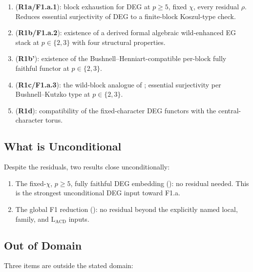 \begin{enumerate}
\item {}
(\textbf{R1a/F1.a.1}): block exhaustion for DEG at \(p\geq 5\),
fixed \(\chi\), every residual \(\rho\). Reduces essential surjectivity
of DEG to a finite-block Koszul-type check.
\item {}
(\textbf{R1b/F1.a.2}): existence of a derived formal algebraic
wild-enhanced EG stack at \(p\in\{2,3\}\) with four structural
properties.
\item {}
(\textbf{R1b'}): existence of the Bushnell--Henniart-compatible
per-block fully faithful functor at \(p\in\{2,3\}\).
\item {}
(\textbf{R1c/F1.a.3}): the wild-block analogue of
; essential
surjectivity per Bushnell--Kutzko type at \(p\in\{2,3\}\).
\item {}
(\textbf{R1d}): compatibility of the fixed-character DEG functors
with the central-character torus.
\end{enumerate}

\subsection{What is Unconditional}

Despite the residuals, two results close unconditionally:

\begin{enumerate}
\item The fixed-\(\chi\), \(p\geq 5\), fully faithful DEG embedding
(): no residual needed.
This is the strongest unconditional DEG input toward F1.a.
\item The global F1 reduction
(): no residual
beyond the explicitly named local, family, and
\(\mathrm{L}_{\mathrm{ACD}}\) inputs.
\end{enumerate}

\subsection{Out of Domain}

Three items are outside the stated domain:

